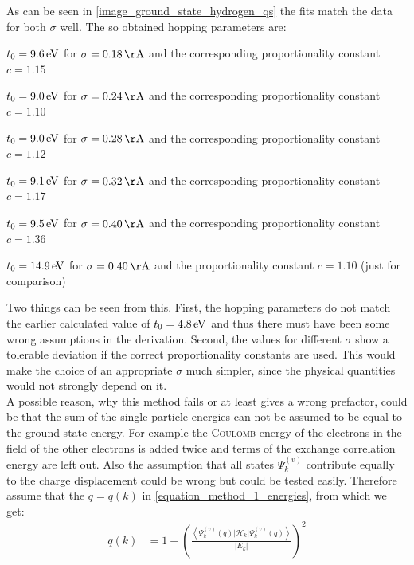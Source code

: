 As can be seen in \cref{image_ground_state_hydrogen_qs} the fits match the data for both $\sigma$ well. The so obtained hopping parameters are:
\begin{compactitem}
	\item $t_0 = \unit[9.6]{eV}$ for $\sigma = \unit[0.18]{\AA}$ and the corresponding proportionality constant $c = 1.15$
	\item $t_0 = \unit[9.0]{eV}$ for $\sigma = \unit[0.24]{\AA}$ and the corresponding proportionality constant $c = 1.10$
	\item $t_0 = \unit[9.0]{eV}$ for $\sigma = \unit[0.28]{\AA}$ and the corresponding proportionality constant $c = 1.12$
	\item $t_0 = \unit[9.1]{eV}$ for $\sigma = \unit[0.32]{\AA}$ and the corresponding proportionality constant $c = 1.17$
	\item $t_0 = \unit[9.5]{eV}$ for $\sigma = \unit[0.40]{\AA}$ and the corresponding proportionality constant $c = 1.36$
	\item $t_0 = \unit[14.9]{eV}$ for $\sigma = \unit[0.40]{\AA}$ and the proportionality constant $c = 1.10$ (just for comparison)
\end{compactitem}
Two things can be seen from this. First, the hopping parameters do not match the earlier calculated value of $t_0 = \unit[4.8]{eV}$ and thus there must have been some wrong assumptions in the derivation. Second, the values for different $\sigma$ show a tolerable deviation if the correct proportionality constants are used. This would make the choice of an appropriate $\sigma$ much simpler, since the physical quantities would not strongly depend on it.\\
A possible reason, why this method fails or at least gives a wrong prefactor, could be that the sum of the single particle energies can not be assumed to be equal to the ground state energy. For example the \textsc{Coulomb} energy of the electrons in the field of the other electrons is added twice and terms of the exchange correlation energy are left out. Also the assumption that all states $\Psi_k^{(v)}$ contribute equally to the charge displacement could be wrong but could be tested easily. Therefore assume that the $q = q(k)$ in \cref{equation_method_1_energies}, from which we get:
\begin{align}
	q(k) &= 1 - \left(\frac{\left\langle\Psi_k^{(v)}(q)\Big|\mathcal{H}_{k}\Big|\Psi_k^{(v)}(q)\right\rangle}{\left|E_k\right|}\right)^2
\end{align}
